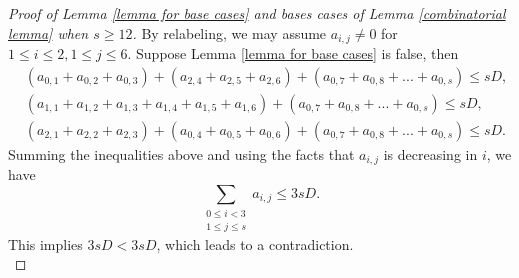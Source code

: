 \documentclass[10pt,a4paper]{amsart}
\begin{document}
\begin{proof}[Proof of Lemma \ref{lemma for base cases} and bases cases of Lemma \ref{combinatorial lemma} when $s\geq 12$]
    By relabeling, we may assume $a_{i,j}\neq 0$ for $1\leq i\leq 2,1\leq j\leq 6$. Suppose Lemma \ref{lemma for base cases} is false, then
    \begin{align*}
        &(a_{0,1}+a_{0,2}+a_{0,3})+(a_{2,4}+a_{2,5}+a_{2,6})+(a_{0,7}+a_{0,8}+...+a_{0,s})\leq sD,\\
        &(a_{1,1}+a_{1,2}+a_{1,3}+a_{1,4}+a_{1,5}+a_{1,6})+(a_{0,7}+a_{0,8}+...+a_{0,s})\leq sD,\\
        &(a_{2,1}+a_{2,2}+a_{2,3})+(a_{0,4}+a_{0,5}+a_{0,6})+(a_{0,7}+a_{0,8}+...+a_{0,s})\leq sD.
    \end{align*}
    Summing the inequalities above and using the facts that $a_{i,j}$ is decreasing in $i$, we have
    \begin{equation*}
        \sum_{\substack{0\leq i<3\\1\leq j\leq s}}a_{i,j}\leq 3sD.
    \end{equation*}
    This implies $3sD<3sD$, which leads to a contradiction.\\
\end{proof}
\end{document}
